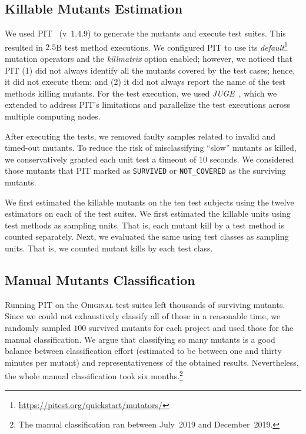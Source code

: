 \documentclass[sigconf]{acmart}
\newcommand{\estimatorCount}{twelve\xspace}
\newcommand{\projectCount}{ten\xspace}
\newcommand{\original}{\textsc{Original}\xspace}
\newcommand{\PIT}{\textsc{PIT}\xspace}
\begin{document}

\subsection{Killable Mutants Estimation}
\label{sec:estimation}
We used \PIT~\cite{pit} (v~1.4.9)
to generate the mutants
and execute test suites.
This resulted in $2.5$B test method executions.
We configured \PIT to use its \emph{default}\footnote{\url{https://pitest.org/quickstart/mutators/}}
mutation operators and the \emph{killmatrix} option enabled; however, we noticed that \PIT
(1) did not always identify all the mutants covered by the test cases; hence, it did not execute them;
and (2) it did not always report the name of the test methods killing mutants. %
For the test execution, we used \emph{JUGE}~\cite{DBLP:journals/corr/abs-2106-07520},
which we
extended to address \PIT's limitations and parallelize the test executions across multiple computing nodes.

After executing the tests, we
removed faulty samples related to invalid and timed-out mutants.
To reduce the risk of misclassifying ``slow'' mutants as killed,
we conservatively granted each unit test a timeout of 10 seconds.
We considered those mutants that 
\PIT marked as \texttt{SURVIVED} or \texttt{NOT\_COVERED} as the surviving mutants.

We first estimated the killable mutants
on the \projectCount test subjects using the \estimatorCount 
estimators on each of the test suites. We first estimated the
killable units using test methods as sampling units. That is, each
mutant kill by a test method is counted separately. Next, we evaluated
the same using test classes as sampling units. That is, we counted
mutant kills by each test class.


\subsection{Manual Mutants Classification}
\label{sec:mutant-classification}
Running \PIT on the \original test suites left thousands of surviving mutants. 
Since we could not exhaustively classify all of those in a reasonable time, we randomly
sampled $100$ survived mutants for each project and used those 
for the manual classification.
We argue that classifying so many mutants is a good balance between classification
effort (estimated to be between one and thirty minutes per mutant) and representativeness 
of the obtained results. Nevertheless, the whole manual classification took six months.\footnote{The manual classification ran between July~2019 and December~2019.}
\end{document}
